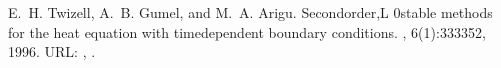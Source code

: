 \documentclass[letterpaper,10pt,english]{sphinxmanual}
\begin{document}
\begin{sphinxthebibliography}{1}
E. H. Twizell, A. B. Gumel, and M. A. Arigu. Second\sphinxhyphen{}order,L 0\sphinxhyphen{}stable methods for the heat equation with time\sphinxhyphen{}dependent boundary conditions. , 6(1):333\textendash{}352, 1996. URL: , .
\end{sphinxthebibliography}



\renewcommand{\indexname}{Index}
\printindex
\end{document}
